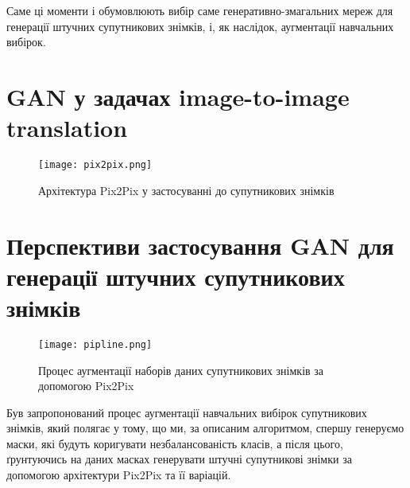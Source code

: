 Саме ці моменти і обумовлюють вибір саме генеративно-змагальних
мереж для генерації штучних супутникових знімків, і, як наслідок,
аугментації навчальних вибірок.

\section{GAN у задачах image-to-image translation}

\begin{figure}[ht]
    \centering
    \texttt{[image: pix2pix.png]}
    \caption{Архітектура Pix2Pix у застосуванні до супутникових знімків}
    \label{fig:pix2pix}
\end{figure}

\section{Перспективи застосування GAN для генерації штучних супутникових знімків}

\begin{figure}[ht]
    \centering
    \texttt{[image: pipline.png]}
    \caption{Процес аугментації наборів даних супутникових знімків за допомогою Pix2Pix}
    \label{fig:pipline}
\end{figure}



\chapconclude{\ref{chap:gans}}

Був запропонований процес аугментації навчальних вибірок супутникових
знімків, який полягає у тому, що ми, за описаним алгоритмом, спершу
генеруємо маски, які будуть коригувати незбалансованість класів,
а після цього, ґрунтуючись на даних масках генерувати штучні
супутникові знімки за допомогою
архітектури Pix2Pix та її варіацій.